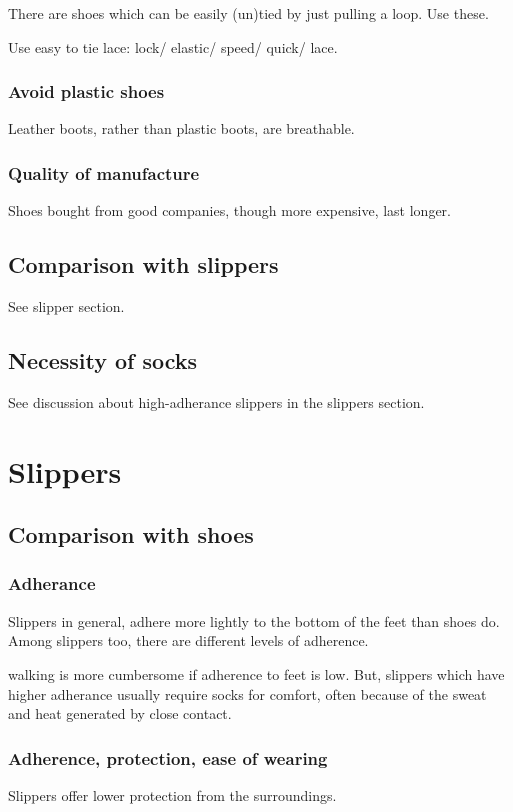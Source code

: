 \documentclass[oneside, article]{memoir}
\begin{document}
There are shoes which can be easily (un)tied by just pulling a loop. Use these.

Use easy to tie lace: lock/ elastic/ speed/ quick/ lace.

\subsubsection{Avoid plastic shoes}
Leather boots, rather than plastic boots, are breathable.

\subsubsection{Quality of manufacture}
Shoes bought from good companies, though more expensive, last longer.

\subsection{Comparison with slippers}
See slipper section.

\subsection{Necessity of socks}
See discussion about high-adherance slippers in the slippers section.

\section{Slippers}
\subsection{Comparison with shoes}
\subsubsection{Adherance}
Slippers in general, adhere more lightly to the bottom of the feet than shoes do. Among slippers too, there are different levels of adherence.

walking is more cumbersome if adherence to feet is low. But, slippers which have higher adherance usually require socks for comfort, often because of the sweat and heat generated by close contact.

\subsubsection{Adherence, protection, ease of wearing}
Slippers offer lower protection from the surroundings.
\end{document}

